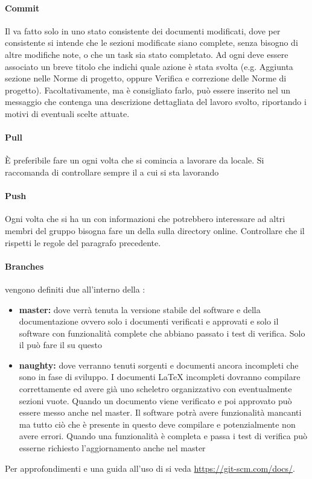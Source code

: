 \documentclass[12pt,a4paper]{article}
\begin{document}
\paragraph{Commit}
Il  va fatto solo in uno stato consistente dei documenti modificati, dove per consistente si intende che le sezioni modificate siano complete, senza bisogno di altre modifiche note, o che un task sia stato completato. Ad ogni  deve essere associato un breve titolo che indichi quale azione è stata svolta (e.g. Aggiunta sezione  nelle Norme di progetto, oppure Verifica e correzione delle Norme di progetto). Facoltativamente, ma è consigliato farlo, può essere inserito nel  un messaggio che contenga una descrizione dettagliata del lavoro svolto, riportando i motivi di eventuali scelte attuate.
\paragraph{Pull}
È preferibile fare un  ogni volta che si comincia a lavorare da locale. Si raccomanda di controllare sempre il  a cui si sta lavorando
\paragraph{Push}
Ogni volta che si ha un  con informazioni che potrebbero interessare ad altri membri del gruppo bisogna fare un  della  sulla directory online. Controllare che il  rispetti le regole del paragrafo precedente.

\paragraph{Branches} vengono definiti due  all'interno della :
\begin{itemize}
	\item \textbf{master:} dove verrà tenuta la versione stabile del software e della documentazione ovvero solo i documenti verificati e  approvati e solo il software con funzionalità complete che abbiano passato i test di verifica. Solo il \RE{} può fare il  su questo 
	\item \textbf{naughty:} dove verranno tenuti sorgenti e documenti ancora incompleti che sono in fase di sviluppo. I documenti \LaTeX{} incompleti dovranno compilare correttamente ed avere già uno scheletro organizzativo con eventualmente sezioni vuote. Quando un documento viene verificato e poi approvato può essere messo anche nel  master. Il software potrà avere funzionalità mancanti ma tutto ciò che è presente in questo  deve compilare e potenzialmente non avere errori. Quando una funzionalità è completa e passa i test di verifica può esserne richiesto l'aggiornamento anche nel  master
\end{itemize}
Per approfondimenti e una guida all'uso di  si veda \url{https://git-scm.com/docs/}.
\end{document}

